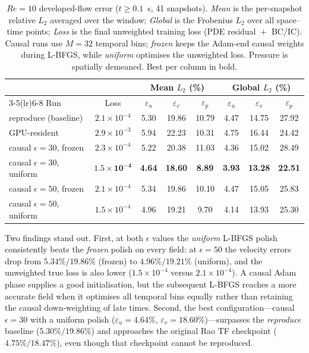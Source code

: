\begin{table}[t]
  \centering
  \caption{$Re=10$ developed-flow error ($t\geq0.1$~s, 41 snapshots).
           \emph{Mean} is the per-snapshot relative $L_2$ averaged over the
           window; \emph{Global} is the Frobenius $L_2$ over all space--time
           points; \emph{Loss} is the final unweighted training loss
           (PDE residual ${}+{}$ BC/IC).  Causal runs use $M=32$ temporal
           bins; \emph{frozen} keeps the Adam-end causal weights during
           L-BFGS, while \emph{uniform} optimises the unweighted loss.
           Pressure is spatially demeaned.  Best per column in bold.}
  \label{tab:l2_causal}
  \begin{tabular}{@{}l c ccc ccc@{}}
    \toprule
    & & \multicolumn{3}{c}{Mean $L_2$ (\%)} & \multicolumn{3}{c}{Global $L_2$ (\%)} \\
    \cmidrule(lr){3-5}\cmidrule(lr){6-8}
    Run & Loss & $\varepsilon_u$ & $\varepsilon_v$ & $\varepsilon_p$
        & $\varepsilon_u$ & $\varepsilon_v$ & $\varepsilon_p$ \\
    \midrule
    reproduce (baseline) & $2.1{\times}10^{-4}$ & 5.30 & 19.86 & 10.79 & 4.47 & 14.75 & 27.92 \\
    GPU-resident         & $2.9{\times}10^{-3}$ & 5.94 & 22.23 & 10.31 & 4.75 & 16.44 & 24.42 \\
    \midrule
    causal $\epsilon{=}30$, frozen  & $2.3{\times}10^{-4}$ & 5.22 & 20.38 & 11.03 & 4.36 & 15.02 & 28.49 \\
    causal $\epsilon{=}30$, uniform & $\mathbf{1.5{\times}10^{-4}}$ & \textbf{4.64} & \textbf{18.60} & \textbf{8.89} & \textbf{3.93} & \textbf{13.28} & \textbf{22.51} \\
    causal $\epsilon{=}50$, frozen  & $2.1{\times}10^{-4}$ & 5.34 & 19.86 & 10.10 & 4.47 & 15.05 & 25.83 \\
    causal $\epsilon{=}50$, uniform & $1.5{\times}10^{-4}$ & 4.96 & 19.21 & 9.70 & 4.14 & 13.93 & 25.30 \\
    \bottomrule
  \end{tabular}
\end{table}

Two findings stand out.  First, at both $\epsilon$ values the
\emph{uniform} L-BFGS polish consistently beats the \emph{frozen} polish
on every field: at $\epsilon=50$ the velocity errors drop from
$5.34\%/19.86\%$ (frozen) to $4.96\%/19.21\%$ (uniform), and the
unweighted true loss is also lower ($1.5\times10^{-4}$ versus
$2.1\times10^{-4}$).  A causal Adam phase supplies a good initialisation,
but the subsequent L-BFGS reaches a more accurate field when it optimises
all temporal bins equally rather than retaining the causal
down-weighting of late times.  Second, the best configuration---causal
$\epsilon=30$ with a uniform polish ($\varepsilon_u=4.64\%$,
$\varepsilon_v=18.60\%$)---surpasses the \emph{reproduce} baseline
($5.30\%/19.86\%$) and approaches the original Rao TF checkpoint
($4.75\%/18.47\%$), even though that checkpoint cannot be reproduced.

